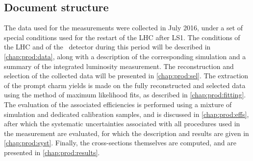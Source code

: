 \subsection{Document structure}
\label{chap:prod:introduction:structure}

The data used for the measurements were collected in July 2016, under a set of 
special conditions used for the restart of the \ac{LHC} after \ac{LS1}.
The conditions of the \ac{LHC} and of the \lhcb\ detector during this period 
will be described in \cref{chap:prod:data}, along with a description of the 
corresponding simulation and a summary of the integrated luminosity 
measurement.
The reconstruction and selection of the collected data will be presented in 
\cref{chap:prod:sel}.
The extraction of the prompt charm yields is made on the fully reconstructed 
and selected data using the method of maximum likelihood fits, as described in 
\cref{chap:prod:fitting}.
The evaluation of the associated efficiencies is performed using a mixture of 
simulation and dedicated calibration samples, and is discussed in 
\cref{chap:prod:effs}, after which the systematic uncertainties associated with 
all procedures used in the measurement are evaluated, for which the description 
and results are given in \cref{chap:prod:syst}.
Finally, the cross-sections themselves are computed, and are presented in 
\cref{chap:prod:results}.
